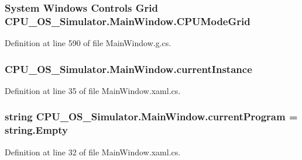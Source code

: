 \subsubsection[{C\+P\+U\+Mode\+Grid}]{\setlength{\rightskip}{0pt plus 5cm}System Windows Controls Grid C\+P\+U\+\_\+\+O\+S\+\_\+\+Simulator.\+Main\+Window.\+C\+P\+U\+Mode\+Grid\hspace{0.3cm}{\ttfamily [package]}}\label{class_c_p_u___o_s___simulator_1_1_main_window_ab6afb45d3f05517e9df6af167752be77}


Definition at line 590 of file Main\+Window.\+g.\+cs.

\hypertarget{class_c_p_u___o_s___simulator_1_1_main_window_a1280266cc57403a91f08a8350dee05cc}{}
\subsubsection[{current\+Instance}]{ C\+P\+U\+\_\+\+O\+S\+\_\+\+Simulator.\+Main\+Window.\+current\+Instance\hspace{0.3cm}{\ttfamily [static]}}\label{class_c_p_u___o_s___simulator_1_1_main_window_a1280266cc57403a91f08a8350dee05cc}


Definition at line 35 of file Main\+Window.\+xaml.\+cs.

\hypertarget{class_c_p_u___o_s___simulator_1_1_main_window_a91f063d9cf776004dc74e719ef942907}{}
\subsubsection[{current\+Program}]{\setlength{\rightskip}{0pt plus 5cm}string C\+P\+U\+\_\+\+O\+S\+\_\+\+Simulator.\+Main\+Window.\+current\+Program = string.\+Empty}\label{class_c_p_u___o_s___simulator_1_1_main_window_a91f063d9cf776004dc74e719ef942907}


Definition at line 32 of file Main\+Window.\+xaml.\+cs.

